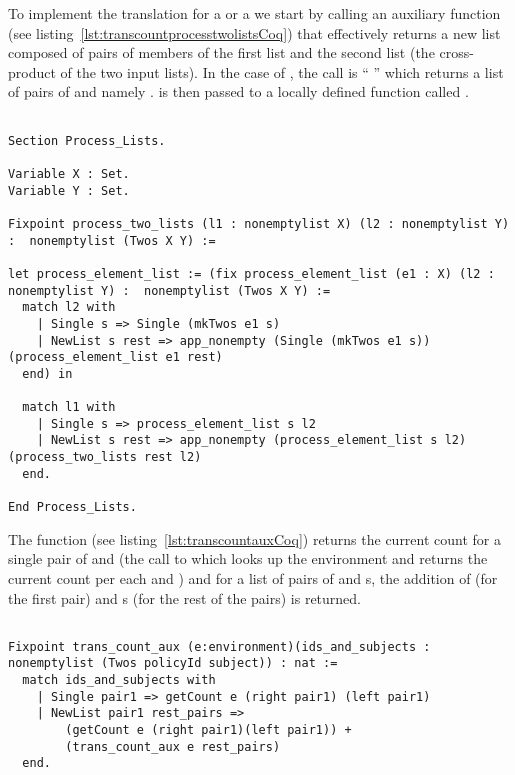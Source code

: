 To implement the translation for a  or a  we start by calling an auxiliary function  (see listing~\ref{lst:transcountprocesstwolistsCoq}) that effectively returns a new list composed of pairs of members of the first list and the second list (the cross-product of the two input lists). In the case of , the call is ``  '' which returns a list of pairs of  and  namely .  is then passed to a locally defined function called .

\begin{lstlisting}

Section Process_Lists.

Variable X : Set.
Variable Y : Set.

Fixpoint process_two_lists (l1 : nonemptylist X) (l2 : nonemptylist Y) :  nonemptylist (Twos X Y) :=

let process_element_list := (fix process_element_list (e1 : X) (l2 : nonemptylist Y) :	nonemptylist (Twos X Y) :=
  match l2 with
    | Single s => Single (mkTwos e1 s)
    | NewList s rest => app_nonempty (Single (mkTwos e1 s)) (process_element_list e1 rest)
  end) in

  match l1 with
    | Single s => process_element_list s l2
    | NewList s rest => app_nonempty (process_element_list s l2) (process_two_lists rest l2)
  end.

End Process_Lists.

\end{lstlisting}


The function  (see listing~\ref{lst:transcountauxCoq}) returns the current count for a single pair of  and  (the call to  which looks up the environment  and returns the current count per each  and ) and for a list of pairs of  and s, the addition of  (for the first pair) and s (for the rest of the pairs) is returned. 

\begin{minipage}[c]{0.95\textwidth}
\begin{lstlisting}

Fixpoint trans_count_aux (e:environment)(ids_and_subjects : nonemptylist (Twos policyId subject)) : nat :=
  match ids_and_subjects with
	| Single pair1 => getCount e (right pair1) (left pair1)
	| NewList pair1 rest_pairs =>
	    (getCount e (right pair1)(left pair1)) +
	    (trans_count_aux e rest_pairs)
  end.
\end{lstlisting}
\end{minipage}


